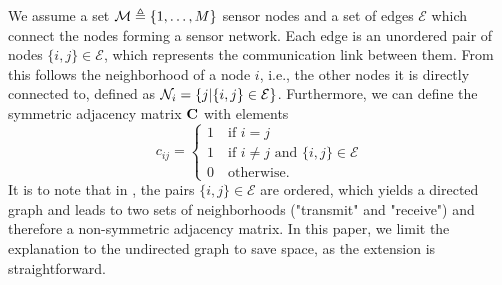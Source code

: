 \documentclass{article}
\begin{document}
We assume a set \(\mathcal{M} \triangleq \{1,\ldots,M\}\) sensor nodes and a set of edges \(\mathcal{E}\) which connect the nodes forming a sensor network.
Each edge is an unordered pair of nodes \(\{i,j\} \in \mathcal{E}\), which represents the communication link between them.
From this follows the neighborhood of a node \(i\), i.e., the other nodes it is directly connected to, defined as \(\mathcal{N}_i = \{j|\{i,j\} \in \mathcal{E}\}\).
Furthermore, we can define the symmetric adjacency matrix \(\bm{\mathrm{C}}\) with elements
\begin{equation}
  c_{ij} = \begin{cases}
    1 \quad \text{if } i = j\\
    1 \quad \text{if } i \neq j \text{ and }\{i,j\} \in \mathcal{E}\\
    0 \quad \text{otherwise}.
  \end{cases}
\end{equation}
It is to note that in \cite{blochbergerDBSI}, the pairs \(\{i,j\} \in \mathcal{E}\) are ordered, which yields a directed graph and leads to two sets of neighborhoods ("transmit" and "receive") and therefore a non-symmetric adjacency matrix.
In this paper, we limit the explanation to the undirected graph to save space, as the extension is straightforward.
\end{document}
